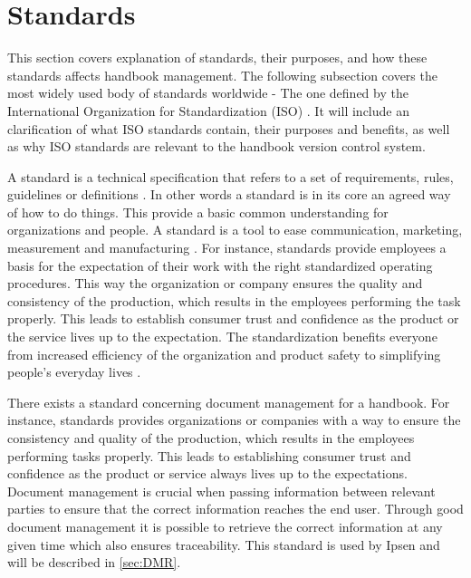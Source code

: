 \section{Standards} \label{sec:standards}
This section covers explanation of standards, their purposes, and how these standards affects handbook management.
The following subsection covers the most widely used body of standards worldwide - The one defined by the International Organization for Standardization (ISO) \cite{ISOworldwidemostused}.
It will include an clarification of what ISO standards contain, their purposes and benefits, as well as why ISO standards are relevant to the handbook version control system.

A standard is a technical specification that refers to a set of requirements, rules, guidelines or definitions \citep[p.~5]{Standard}.
In other words a standard is in its core an agreed way of how to do things.
This provide a basic common understanding for organizations and people.
A standard is a tool to ease communication, marketing, measurement and manufacturing \cite{Standardtool}.
For instance, standards provide employees a basis for the expectation of their work with the right standardized operating procedures.
This way the organization or company ensures the quality and consistency of the production, which results in the employees performing the task properly.
This leads to establish consumer trust and confidence as the product or the service lives up to the expectation.
The standardization benefits everyone from increased efficiency of the organization and product safety to simplifying people's everyday lives \citep[p.~83]{Standardization}.

There exists a standard concerning document management for a handbook.
For instance, standards provides organizations or companies with a way to ensure the consistency and quality of the production, which results in the employees performing tasks properly.
This leads to establishing consumer trust and confidence as the product or service always lives up to the expectations. \citep[p.~83]{Standardization}
Document management is crucial when passing information between relevant parties to ensure that the correct information reaches the end user.
Through good document management it is possible to retrieve the correct information at any given time which also ensures traceability.
This standard is used by Ipsen and will be described in \cref{sec:DMR}.

